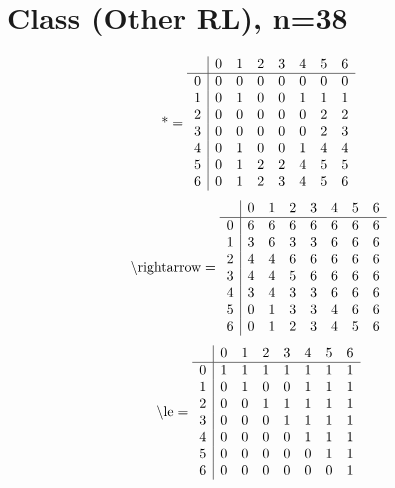 \documentclass[11pt]{article}
\begin{document}
\section{Class (Other RL), n=38}
\[\text{*} = 
\begin{array}{r | r r r r r r r}
 & 0 & 1 & 2 & 3 & 4 & 5 & 6 \\ \hline
0 & 0 & 0 & 0 & 0 & 0 & 0 & 0 \\
1 & 0 & 1 & 0 & 0 & 1 & 1 & 1 \\
2 & 0 & 0 & 0 & 0 & 0 & 2 & 2 \\
3 & 0 & 0 & 0 & 0 & 0 & 2 & 3 \\
4 & 0 & 1 & 0 & 0 & 1 & 4 & 4 \\
5 & 0 & 1 & 2 & 2 & 4 & 5 & 5 \\
6 & 0 & 1 & 2 & 3 & 4 & 5 & 6 \\
\end{array}
\]
\[\text{\textbackslash rightarrow} = 
\begin{array}{r | r r r r r r r}
 & 0 & 1 & 2 & 3 & 4 & 5 & 6 \\ \hline
0 & 6 & 6 & 6 & 6 & 6 & 6 & 6 \\
1 & 3 & 6 & 3 & 3 & 6 & 6 & 6 \\
2 & 4 & 4 & 6 & 6 & 6 & 6 & 6 \\
3 & 4 & 4 & 5 & 6 & 6 & 6 & 6 \\
4 & 3 & 4 & 3 & 3 & 6 & 6 & 6 \\
5 & 0 & 1 & 3 & 3 & 4 & 6 & 6 \\
6 & 0 & 1 & 2 & 3 & 4 & 5 & 6 \\
\end{array}
\]
\[\text{\textbackslash le} = 
\begin{array}{r | r r r r r r r}
 & 0 & 1 & 2 & 3 & 4 & 5 & 6 \\ \hline
0 & 1 & 1 & 1 & 1 & 1 & 1 & 1 \\
1 & 0 & 1 & 0 & 0 & 1 & 1 & 1 \\
2 & 0 & 0 & 1 & 1 & 1 & 1 & 1 \\
3 & 0 & 0 & 0 & 1 & 1 & 1 & 1 \\
4 & 0 & 0 & 0 & 0 & 1 & 1 & 1 \\
5 & 0 & 0 & 0 & 0 & 0 & 1 & 1 \\
6 & 0 & 0 & 0 & 0 & 0 & 0 & 1 \\
\end{array}
\]
\end{document}
